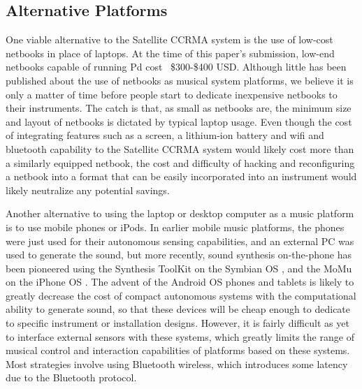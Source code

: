 \subsection{Alternative Platforms}
One viable alternative to the Satellite CCRMA system is the use of low-cost netbooks in place of laptops. At the time of this paper's submission, low-end netbooks capable of running Pd cost ~\$300-\$400 USD. Although little has been published about the use of netbooks as musical system platforms, we believe it is only a matter of time before people start to dedicate inexpensive netbooks to their instruments. The catch is that, as small as netbooks are, the minimum size and layout of netbooks is dictated by typical laptop usage. Even though the cost of integrating features such as a screen, a lithium-ion battery and wifi and bluetooth capability to the Satellite CCRMA system would likely cost more than a similarly equipped netbook, the cost and difficulty of hacking and reconfiguring a netbook into a format that can be easily incorporated into an instrument would likely neutralize any potential savings.

Another alternative to using the laptop or desktop computer as a music platform is to use mobile phones or iPods. In earlier mobile music platforms, the phones were just used for their autonomous sensing capabilities, and an external PC was used to generate the sound, but more recently, sound synthesis on-the-phone has been pioneered using the Synthesis ToolKit on the Symbian OS \cite{Essl:2006b}, and the MoMu on the iPhone OS \cite{Bryan:2010}. The advent of the Android OS phones and tablets is likely to greatly decrease the cost of compact autonomous systems with the computational ability to generate sound, so that these devices will be cheap enough to dedicate to specific instrument or installation designs. However, it is fairly difficult as yet to interface external sensors with these systems, which greatly limits the range of musical control and interaction capabilities of platforms based on these systems. Most strategies involve using Bluetooth wireless, which introduces some latency due to the Bluetooth protocol.

